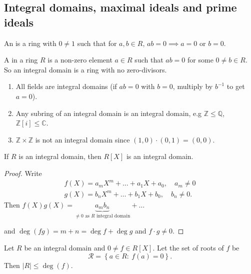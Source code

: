 \documentclass[egregdoesnotlikesansseriftitles,a4paper]{scrartcl}
\begin{document}
\subsection{Integral domains, maximal ideals and prime ideals}
\begin{definition*}
       An  is a ring with $0 \neq 1$ such that for $a,b \in R$, $ab=0 \implies a=0 \text{ or } b=0$.

       A  in a ring $R$ is a non-zero element $a \in R$ such that $ab=0$ for some $0 \neq b \in R$. So an integral domain is a ring with no zero-divisors.
\end{definition*}
\begin{example*}
       \begin{enumerate}
             \item All fields are integral domains (if $ab=0$ with $b=0$, multiply by $b^{-1}$ to get $a=0$).
             \item Any subring of an integral domain is an integral domain, e.g $\mathbb{Z} \leq  \mathbb{Q}$, $\mathbb{Z}[i] \leq \mathbb{C}$.
             \item $\mathbb{Z} \times \mathbb{Z}$ is not an integral domain since $\left(1,0\right)\cdot \left(0,1\right)=\left(0,0\right)$.
       \end{enumerate}
\end{example*}
\begin{lemma}
       If $R$ is an integral domain, then $R[X]$ is an integral domain.
\end{lemma}
\begin{proof}
       Write
       \begin{align*}
            f \left(X\right)=a_{m}X^{m}+\ldots+a_1 X+ a_0, \quad a_{m}\neq 0\\
            g \left(X\right)=b_{n}X^{m}+\ldots+b_1 X+ b_0, \quad b_{n}\neq 0.
       \end{align*}
       Then $f \left(X\right)g \left(X\right)=\underbrace{a_{m}b_{n}}_{\neq 0 \text{ as } R \text{ integral domain} }+\ldots $ 
       
       and $\operatorname{deg}\left(fg\right)=m+n=\operatorname{deg}f+ \operatorname{deg}g$ and $f \cdot g \neq 0$.
\end{proof}
\begin{lemma}
       Let $R$ be an integral domain and $0 \neq f \in R[X]$. Let the set of roots of $f$ be \[
       \mathcal{R}=\left\{a \in R: \ f (a)=0\right\}
       .\] Then $\left|R\right|\leq \operatorname{deg}(f)$.
\end{lemma}
\end{document}
